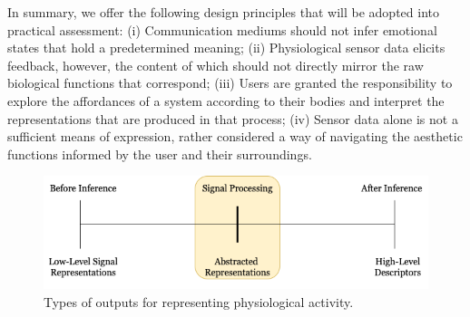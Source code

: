 In summary, we offer the following design principles that will be adopted into practical assessment: (i) Communication mediums should not infer emotional states that hold a predetermined meaning; (ii) Physiological sensor data elicits feedback, however, the content of which should not directly mirror the raw biological functions that correspond; (iii) Users are granted the responsibility to explore the affordances of a system according to their bodies and interpret the representations that are produced in that process; (iv) Sensor data alone is not a sufficient means of expression, rather considered a way of navigating the aesthetic functions informed by the user and their surroundings.

\begin{figure}[htbp]
	\centering
	\includegraphics[width=1.0\textwidth]{Chapters/Figures/Abstracted_Representations.png}
	\caption{Types of outputs for representing physiological activity.}
	\label{fig:Abstracted_Representations}
\end{figure}

